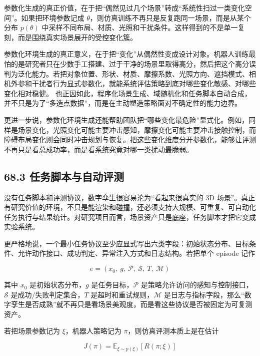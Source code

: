 参数化生成的真正价值，在于把“偶然见过几个场景”转成“系统性扫过一类变化空间”。如果把环境参数记成 \(\theta\)，则仿真训练不再只是反复跑同一场景，而是从某个分布 \(p(\theta)\) 中采样不同布局、材质、光照和干扰条件。这样得到的不是单一复刻，而是围绕真实场景展开的受控变化簇。

参数化环境生成的真正意义，在于把“变化”从偶然性变成设计对象。机器人训练最怕的是研究者只在少数手工搭建、过于干净的场景里取得高分，然后把这个高分误判为泛化能力。若把对象位置、形状、材质、摩擦系数、光照方向、遮挡模式、相机外参和干扰者行为显式参数化，就能系统评估策略到底对哪些变化敏感、对哪些变化相对稳健。 也正因如此，程序化场景生成、域随机化和任务脚本自动合成，并不只是为了“多造点数据”，而是在主动塑造策略面对不确定性的能力边界。

更进一步说，参数化环境生成还能帮助团队把“哪些变化最危险”显式化。例如，同样是场景变化，光照变化可能主要冲击感知，摩擦变化可能主要冲击接触控制，而障碍布局变化则会同时冲击规划与恢复。把这些变化维度分开参数化，能够让评测不再只是看总成功率，而是看系统究竟对哪一类扰动最脆弱。

\subsection*{68.3 任务脚本与自动评测}


没有任务脚本和评测协议，数字孪生很容易沦为“看起来很真实的 3D 场景”。真正有研究价值的环境，不只是能渲染和碰撞，还必须支持大规模、可重复、可自动化任务执行与结果统计。对研究项目而言，场景资产只是底座，任务脚本才把它变成实验系统。

更严格地说，一个最小任务协议至少应显式写出六类字段：初始状态分布、目标条件、允许动作接口、成功判定、异常注入方式和日志结构。若把单个 episode 记作

\begingroup
\footnotesize
\begin{equation*}
e = (x_0,\ g,\ \mathcal{P},\ \mathcal{S},\ T,\ \mathcal{M})
\end{equation*}
\endgroup

其中 \(x_0\) 是初始状态分布，\(g\) 是任务目标，\(\mathcal{P}\) 是策略允许访问的感知与控制接口，\(\mathcal{S}\) 是成功/失败判定集合，\(T\) 是超时和重试规则，\(\mathcal{M}\) 是日志与指标字段，那么“数字孪生是否成熟”就不再只是看场景美观度，而是看这些协议是否被固定为可复测资产。

若把场景参数记为 \(\xi\)，机器人策略记为 \(\pi\)，则仿真评测本质上是在估计

\begingroup
\footnotesize
\begin{equation*}
J(\pi) = \mathbb{E}_{\xi \sim p(\xi)} \left[ R(\pi; \xi) \right]
\end{equation*}
\endgroup

